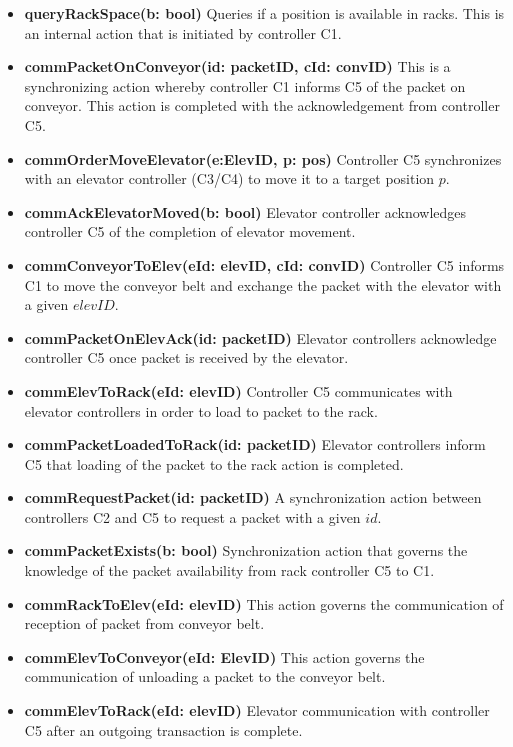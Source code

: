 \begin{itemize}
\item \textbf{queryRackSpace(b: bool)}
Queries if a position is available in racks. This is an internal action that is initiated by controller C1.

\item \textbf{commPacketOnConveyor(id: packetID, cId: convID)}
This is a synchronizing action whereby controller C1 informs C5 of the packet on conveyor. This action is completed with the acknowledgement from controller C5.

\item \textbf{commOrderMoveElevator(e:ElevID, p: pos)}
Controller C5 synchronizes with an elevator controller (C3/C4) to move it to a target position $p$.

\item \textbf{commAckElevatorMoved(b: bool)}
Elevator controller acknowledges controller C5 of the completion of elevator movement.

\item \textbf{commConveyorToElev(eId: elevID, cId: convID)}
Controller C5 informs C1 to move the conveyor belt and exchange the packet with the elevator with a given $elevID$.

\item \textbf{commPacketOnElevAck(id: packetID)}
Elevator controllers acknowledge controller C5 once packet is received by the elevator.

\item \textbf{commElevToRack(eId: elevID)}
Controller C5 communicates with elevator controllers in order to load to packet to the rack.

\item \textbf{commPacketLoadedToRack(id: packetID)}
Elevator controllers inform C5 that loading of the packet to the rack action is completed.

\item \textbf{commRequestPacket(id: packetID)}
A synchronization action between controllers C2 and C5 to request a packet with a given $id$.

\item \textbf{commPacketExists(b: bool)}
Synchronization action that governs the knowledge of the packet availability from rack controller C5 to C1.

\item \textbf{commRackToElev(eId:  elevID)}
This action governs the communication of reception of packet from conveyor belt.

\item \textbf{commElevToConveyor(eId: ElevID)}
This action governs the communication of unloading a packet to the conveyor belt.

\item \textbf{commElevToRack(eId: elevID)}
Elevator communication with controller C5 after an outgoing transaction is complete.
\end{itemize}

